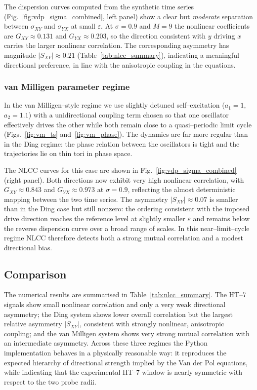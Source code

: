 \documentclass[12pt]{article}
\begin{document}
The dispersion curves computed from the synthetic time series
(Fig.~\ref{fig:vdp_sigma_combined}, left panel) show a clear but
\emph{moderate} separation between $\sigma_{XY}$ and $\sigma_{YX}$ at
small $\varepsilon$.  At $\sigma=0.9$ and $M=9$ the nonlinear
coefficients are $G_{XY}\approx 0.131$ and $G_{YX}\approx 0.203$, so the
direction consistent with $y$ driving $x$ carries the larger nonlinear
correlation.  The corresponding asymmetry has magnitude
$|S_{XY}|\approx 0.21$ (Table~\ref{tab:nlcc_summary}), indicating a
meaningful directional preference, in line with the anisotropic
coupling in the equations.

\subsubsection*{van Milligen parameter regime}

In the van Milligen–style regime we use slightly detuned self–excitation
($a_1=1$, $a_2=1.1$) with a unidirectional coupling term chosen so that
one oscillator effectively drives the other while both remain close to a
quasi–periodic limit cycle (Figs.~\ref{fig:vm_ts} and~\ref{fig:vm_phase}).
The dynamics are far more regular than in the Ding regime: the phase
relation between the oscillators is tight and the trajectories lie on
thin tori in phase space.

The NLCC curves for this case are shown in
Fig.~\ref{fig:vdp_sigma_combined} (right panel).  Both directions now
exhibit very high nonlinear correlation, with
$G_{XY}\approx 0.843$ and $G_{YX}\approx 0.973$ at $\sigma=0.9$,
reflecting the almost deterministic mapping between the two time series.
The asymmetry $|S_{XY}|\approx 0.07$ is smaller than in the Ding case
but still nonzero: the ordering consistent with the imposed drive
direction reaches the reference level at slightly smaller $\varepsilon$
and remains below the reverse dispersion curve over a broad range of
scales.  In this near–limit–cycle regime NLCC therefore detects both a
strong mutual correlation and a modest directional bias.

\subsection{Comparison}

The numerical results are summarised in Table~\ref{tab:nlcc_summary}.
The HT--7 signals show small nonlinear correlation and only a very weak
directional asymmetry; the Ding system shows lower overall correlation
but the largest relative asymmetry $|S_{XY}|$, consistent with strongly
nonlinear, anisotropic coupling; and the van Milligen system shows very
strong mutual correlation with an intermediate asymmetry.  Across these
three regimes the Python implementation behaves in a physically
reasonable way: it reproduces the expected hierarchy of directional
strength implied by the Van der Pol equations, while indicating that the
experimental HT--7 window is nearly symmetric with respect to the two
probe radii.
\end{document}
